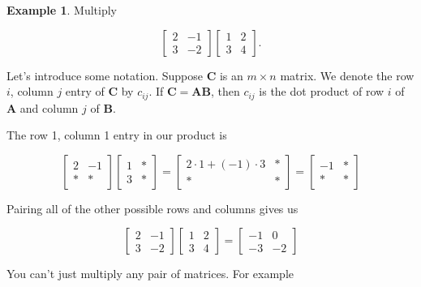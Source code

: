 \documentclass[
]{book}
\theoremstyle{definition}
\theoremstyle{definition}
\newtheorem{example}{Example}[chapter]
\theoremstyle{definition}
\theoremstyle{definition}
\theoremstyle{remark}
\begin{document}
\begin{examplebox}

\begin{example}
\protect\hypertarget{exm:twobytwo}{}\label{exm:twobytwo}Multiply

\[\begin{bmatrix} 2 & -1 \\ 3 & -2\end{bmatrix} \begin{bmatrix}1 & 2\\3 & 4\end{bmatrix}.\]

Let's introduce some notation. Suppose \(\mathbf{C}\) is an \(m\times n\) matrix. We denote the row \(i\), column \(j\) entry of \(\mathbf{C}\) by \(c_{ij}\). If \(\mathbf{C}=\mathbf{A}\mathbf{B}\), then \(c_{ij}\) is the dot product of row \(i\) of \(\mathbf{A}\) and column \(j\) of \(\mathbf{B}\).

The row 1, column 1 entry in our product is

\[\begin{bmatrix} 2 & -1 \\ * & *\end{bmatrix} \begin{bmatrix}1 & *\\3 & *\end{bmatrix}=\begin{bmatrix} 2\cdot 1+(-1)\cdot 3 & *\\ * & *\end{bmatrix}=\begin{bmatrix} -1 & *\\ * & *\end{bmatrix}\]

Pairing all of the other possible rows and columns gives us

\[\begin{bmatrix} 2 & -1 \\ 3 & -2\end{bmatrix} \begin{bmatrix}1 & 2\\3 & 4\end{bmatrix}=\begin{bmatrix}-1 & 0\\-3 & -2\end{bmatrix}\]
\end{example}

\end{examplebox}

You can't just multiply any pair of matrices. For example
\end{document}
